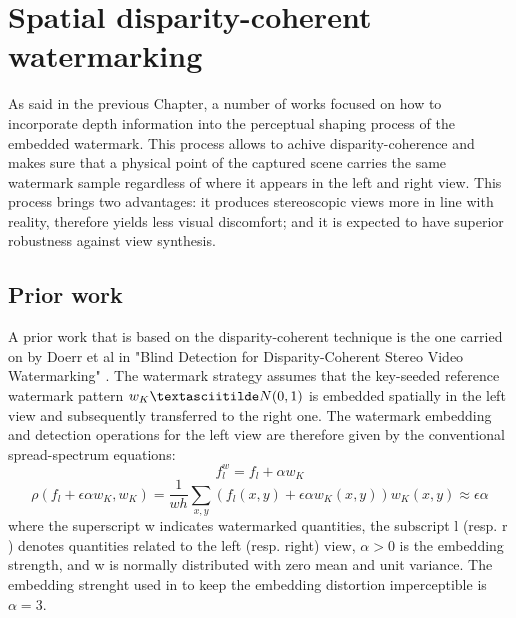 \chapter{Spatial disparity-coherent watermarking}
\label{spa}



As said in the previous Chapter, a number of works focused on how to incorporate depth information into the perceptual shaping process of the embedded watermark.\newline 
This process allows to achive disparity-coherence and makes sure that a physical point of the captured scene carries the same watermark sample regardless of where it appears in the left and right view.\newline
This process brings two advantages: it produces stereoscopic views more in line with reality, therefore yields less visual discomfort; and it is expected to have superior robustness against view synthesis.\newline

\section{Prior work} 

A prior work that is based on the disparity-coherent technique is the one carried on by Doerr et al in "Blind Detection for Disparity-Coherent
Stereo Video Watermarking" \cite{DOER2}.\newline
The watermark strategy  assumes that the key-seeded reference watermark pattern $w_{K}\textasciitilde N(0, 1)$ is embedded spatially in the left view and subsequently transferred to the right one.\newline
The watermark embedding and detection operations for the left view are therefore given by the conventional spread-spectrum equations:\newline
$$f_{l}^{w} = f_{l}+\alpha w_{K}$$
$$\rho(f_{l}+\epsilon\alpha w_{K},w_{K})= \frac{1}{wh}\sum_{x,y}(f_{l}(x,y)+\epsilon\alpha w_{K}(x,y))w_{K}(x,y)\approx\epsilon\alpha $$
where the superscript w indicates watermarked quantities, the subscript l (resp. r ) denotes quantities related to the left (resp. right) view, $\alpha > 0$ is the embedding strength, and w is normally distributed with zero mean and unit variance.\newline
The embedding strenght used in \cite{DOER2} to keep the embedding distortion imperceptible is $\alpha = 3$.\newline 

